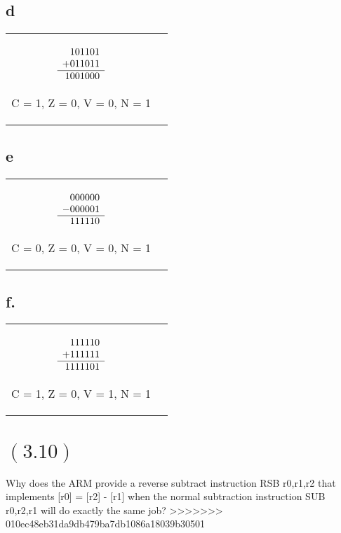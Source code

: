 \documentclass[letterpaper,12pt,titlepage]{article}
\begin{document}
\subsection*{d}
\begin{mdframed}[style=MyFrame]
\begin{tabular}{c c}
$\begin{array}[t]{r}
   101101 \\
  +011011 \\\hline
  1001000 \\
\end{array}$

C = 1,
Z = 0,
V = 0,
N = 1
\end{tabular}
\end{mdframed}
\newpage
\subsection*{e}
\begin{mdframed}[style=MyFrame]
\begin{tabular}{c c}
$\begin{array}[t]{r}
   000000 \\
  -000001 \\\hline
   111110 \\
\end{array}$

C = 0,
Z = 0,
V = 0,
N = 1
\end{tabular}
\end{mdframed}

\subsection*{f.}
\begin{mdframed}[style=MyFrame]
\begin{tabular}{c c}
$\begin{array}[t]{r}
   111110 \\
  +111111 \\\hline
  1111101 \\
\end{array}$

C = 1,
Z = 0,
V = 1,
N = 1
\end{tabular}
\end{mdframed}

\section*{$(3.10)$} Why does the ARM provide a reverse subtract instruction RSB r0,r1,r2 that implements [r0] = [r2] - [r1] when the normal subtraction instruction SUB r0,r2,r1 will do exactly the same job? \newline
>>>>>>> 010ec48eb31da9db479ba7db1086a18039b30501
\end{document}
